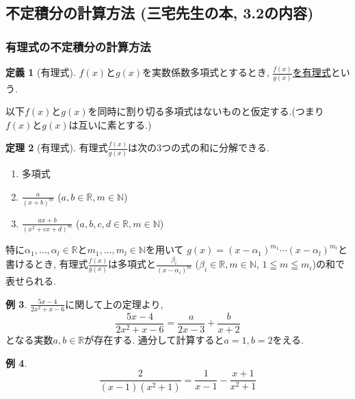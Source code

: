 \documentclass[dvipdfmx,a4paper,11pt]{article}
\newcommand{\R}{\mathbb{R}}
\newcommand{\N}{\mathbb{N}}
\theoremstyle{definition}
\newtheorem{thm}{定理}
\newtheorem{dfn}[thm]{定義}
\newtheorem{exa}[thm]{例}
\begin{document}
\subsection{不定積分の計算方法 (三宅先生の本, 3.2の内容)}
\label{1_3}
\subsubsection{有理式の不定積分の計算方法}

 
\begin{tcolorbox}[
    colback = white,
    colframe = green!35!black,
    fonttitle = \bfseries,
    breakable = true]
    \begin{dfn}[有理式]
  $f(x)$と$g(x)$を実数係数多項式とするとき, \underline{$\frac{f(x)}{g(x)}$を有理式}という.
        \end{dfn}
    \end{tcolorbox}

以下$f(x)$と$g(x)$を同時に割り切る多項式はないものと仮定する.(つまり$f(x)$と$g(x)$は互いに素とする.)

\begin{tcolorbox}[
    colback = white,
    colframe = green!35!black,
    fonttitle = \bfseries,
    breakable = true]
    \begin{thm}[有理式]
有理式$\frac{f(x)}{g(x)}$は次の3つの式の和に分解できる.
\begin{enumerate}
    \setlength{\parskip}{0cm} 
  \setlength{\itemsep}{0cm} 
\item 多項式
\item $\frac{a}{(x+b)^m}$ ($a,b \in \R, m\in \N$)
\item $\frac{ax + b}{(x^2 + cx +d)^m}$ ($a,b,c,d \in \R, m\in \N$)
\end{enumerate}
特に$\alpha_1, \ldots, \alpha_l \in \R$と$m_1, \ldots, m_l \in \N$を用いて
$g(x) = (x- \alpha_1)^{m_1} \cdots (x- \alpha_l)^{m_l} $と書けるとき, 
有理式$\frac{f(x)}{g(x)}$は多項式と$\frac{\beta_i}{(x- \alpha_i)^m}$ ($\beta_i \in \R, m\in \N$, $1 \leqq m\leqq m_i$)の和で表せられる.
        \end{thm}
    \end{tcolorbox}
\begin{exa}
$\frac{5x -4 }{2x^2 + x -6}$に関して上の定理より, 
$$
\frac{5x -4 }{2x^2 + x -6} = \frac{a}{2x-3} + \frac{b}{x+2}
$$
となる実数$a,b \in \R$が存在する.
通分して計算すると$a=1, b=2$をえる.

\end{exa}
\begin{exa}
$$
\frac{2}{(x-1)(x^2 + 1)} = \frac{1}{x-1} - \frac{x+1}{x^2 + 1}
$$
\end{exa}
\end{document}
